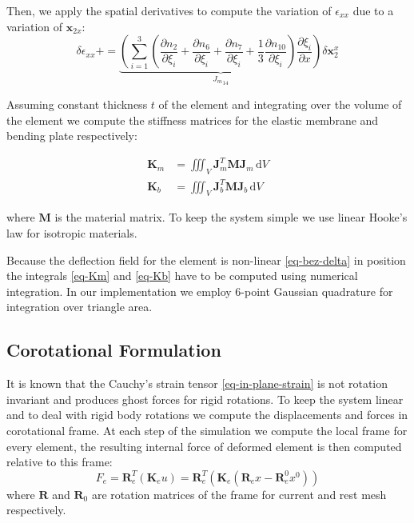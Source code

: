 \documentclass{egpubl}
\newcommand{\deriv}[2]{\frac{\partial #1}{\partial #2}}
\newcommand{\mat}[1]{\mathbf{#1}}
\begin{document}
Then, we apply the spatial derivatives to compute the variation of $\epsilon_{xx}$ due to a variation of $\mathbf{x}_{2x}$:
\begin{equation}
    \delta \epsilon_{xx} += 
    \underbrace{\left(
    \sum_{i=1}^{3} (\deriv{n_2}{\xi_i} + \deriv{n_6}{\xi_i} + \deriv{n_7}{\xi_i} + \frac{1}{3}\deriv{n_{10}}{\xi_i})
    \deriv{\xi_i}{x} \right) }_{{J_m}_{14}}  
 \delta \mathbf{x}_2^x 
\end{equation}

Assuming constant thickness $t$ of the element and integrating over the volume
of the element we compute the stiffness matrices for the elastic membrane
and bending plate respectively:

\begin{align}
    \label{eq-Km}
    \mat{K}_m & = \iiint_V \mat{J}_m^T \mat{M} \mat{J}_m \, \mathrm{d} V \\
    \label{eq-Kb}
    \mat{K}_b & = \iiint_V \mat{J}_b^T \mat{M} \mat{J}_b \, \mathrm{d} V
\end{align}

\noindent
where $\mat{M}$ is the material matrix. To keep the system simple we use linear
Hooke's law for isotropic materials.

Because the deflection field for the element is non-linear \eqref{eq-bez-delta}
in position the integrals \eqref{eq-Km} and \eqref{eq-Kb} have to be computed using
numerical integration. In our implementation we employ 6-point Gaussian
quadrature for integration over triangle area.


\subsection{Corotational Formulation} %
\label{sec-corot}

It is known that the Cauchy's strain tensor \eqref{eq-in-plane-strain} is not
rotation invariant \cite{Hauth2004,Muller2004} and produces ghost forces for rigid
rotations.%
To keep the system linear and to deal
with rigid body rotations we compute the displacements and forces in
corotational frame. At each step of the simulation we compute the local
frame for every element, the resulting internal force of deformed element
is then computed relative to this frame:
%
\begin{equation}
    F_e = \mat{R}_e^T (\mat{K}_e u) = \mat{R}_e^T \left(\mat{K}_e(\mat{R}_e x - \mat{R}_e^0 x^0)\right)
\end{equation}
%
where $\mat{R}$ and $\mat{R}_0$ are rotation matrices of the frame for current and rest
mesh respectively.
\end{document}
